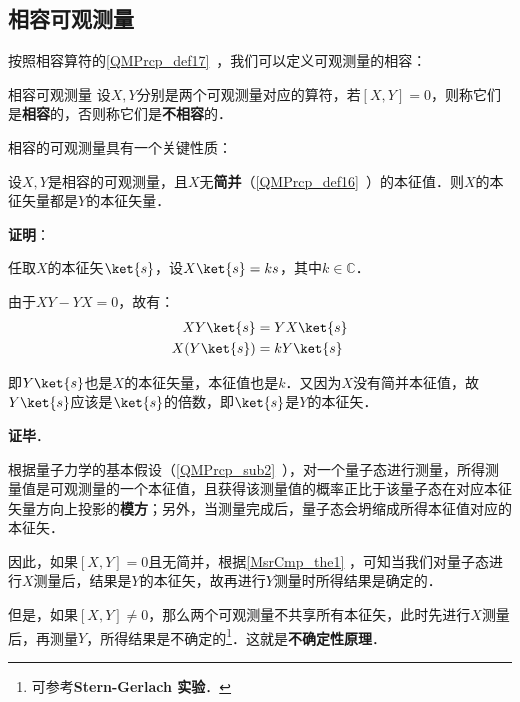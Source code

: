 


\subsection{相容可观测量}


按照相容算符的\autoref{QMPrcp_def17}~，我们可以定义可观测量的相容：

\begin{definition}{相容可观测量}
设$X, Y$分别是两个可观测量对应的算符，若$[X, Y]=0$，则称它们是\textbf{相容}的，否则称它们是\textbf{不相容}的．
\end{definition}

相容的可观测量具有一个关键性质：

\begin{theorem}{}\label{MsrCmp_the1}
设$X, Y$是相容的可观测量，且$X$无\textbf{简并}（\autoref{QMPrcp_def16}~）的本征值．则$X$的本征矢量都是$Y$的本征矢量．
\end{theorem}

\textbf{证明}：

任取$X$的本征矢$\ket{s}$，设$X\ket{s}=ks$，其中$k\in\mathbb{C}$．

由于$XY-YX=0$，故有：
\begin{equation}
\begin{aligned}
XY\ket{s} &= YX\ket{s}\\
X(Y\ket{s}) &= kY\ket{s}
\end{aligned}
\end{equation}

即$Y\ket{s}$也是$X$的本征矢量，本征值也是$k$．又因为$X$没有简并本征值，故$Y\ket{s}$应该是$\ket{s}$的倍数，即$\ket{s}$是$Y$的本征矢．

\textbf{证毕}．


根据量子力学的基本假设（\autoref{QMPrcp_sub2}~），对一个量子态进行测量，所得测量值是可观测量的一个本征值，且获得该测量值的概率正比于该量子态在对应本征矢量方向上投影的\textbf{模方}；另外，当测量完成后，量子态会坍缩成所得本征值对应的本征矢．

因此，如果$[X, Y]=0$且无简并，根据\autoref{MsrCmp_the1} ，可知当我们对量子态进行$X$测量后，结果是$Y$的本征矢，故再进行$Y$测量时所得结果是确定的．

但是，如果$[X, Y]\neq 0$，那么两个可观测量不共享所有本征矢，此时先进行$X$测量后，再测量$Y$，所得结果是不确定的\footnote{可参考\textbf{Stern-Gerlach 实验}．}．这就是\textbf{不确定性原理}．



